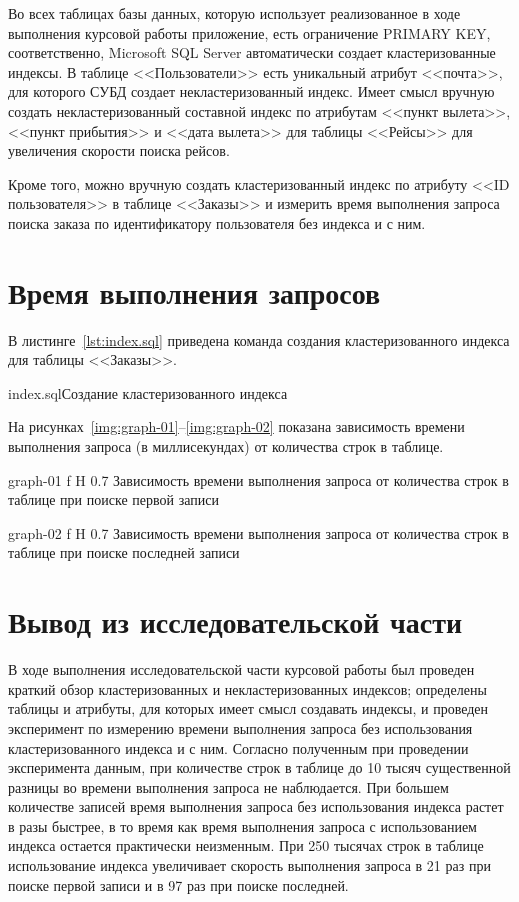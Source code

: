 \documentclass{bmstu}
\begin{document}
Во всех таблицах базы данных, которую использует реализованное в ходе выполнения курсовой работы приложение, есть ограничение PRIMARY KEY, соответственно, Microsoft SQL Server автоматически создает кластеризованные индексы. 
В таблице <<Пользователи>> есть уникальный атрибут <<почта>>, для которого СУБД создает некластеризованный индекс. 
Имеет смысл вручную создать некластеризованный составной индекс по атрибутам <<пункт вылета>>, <<пункт прибытия>> и <<дата вылета>> для таблицы <<Рейсы>> для увеличения скорости поиска рейсов. 

Кроме того, можно вручную создать кластеризованный индекс по атрибуту <<ID пользователя>> в таблице <<Заказы>> и измерить время выполнения запроса поиска заказа по идентификатору пользователя без индекса и с ним.

\section{Время выполнения запросов}

В листинге~\ref{lst:index.sql} приведена команда создания кластеризованного индекса для таблицы <<Заказы>>.

{index.sql}{Создание кластеризованного индекса}

На рисунках~\ref{img:graph-01}--\ref{img:graph-02} показана зависимость времени выполнения запроса (в миллисекундах) от количества строк в таблице.

    {graph-01}
    {f}
    {H}
    {0.7\textwidth}
    {Зависимость времени выполнения запроса от количества строк в таблице при поиске первой записи}
    
    {graph-02}
    {f}
    {H}
    {0.7\textwidth}
    {Зависимость времени выполнения запроса от количества строк в таблице при поиске последней записи}

\section*{Вывод из исследовательской части}

В ходе выполнения исследовательской части курсовой работы был проведен краткий обзор кластеризованных и некластеризованных индексов; определены таблицы и атрибуты, для которых имеет смысл создавать индексы, и проведен эксперимент по измерению времени выполнения запроса без использования кластеризованного индекса и с ним. 
Согласно полученным при проведении эксперимента данным, при количестве строк в таблице до 10 тысяч существенной разницы во времени выполнения запроса не наблюдается. 
При большем количестве записей время выполнения запроса без использования индекса растет в разы быстрее, в то время как время выполнения запроса с использованием индекса остается практически неизменным. 
При 250 тысячах строк в таблице использование индекса увеличивает скорость выполнения запроса в 21 раз при поиске первой записи и в 97 раз при поиске последней.
\end{document}
